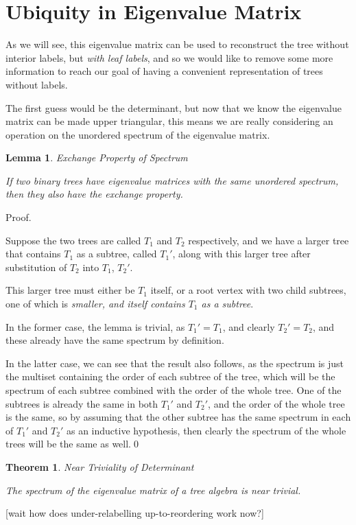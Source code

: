 \documentclass[10pt,a4paper]{report}
\newtheorem{theorem}{Theorem}
\newtheorem{lemma}{Lemma}
\begin{document}
\section{Ubiquity in Eigenvalue Matrix}

As we will see, this eigenvalue matrix can be used to reconstruct the tree without interior labels, but \emph{with leaf labels}, and so we would like to remove some more information to reach our goal of having a convenient representation of trees without labels.

The first guess would be the determinant, but now that we know the eigenvalue matrix can be made upper triangular, this means we are really considering an operation on the unordered spectrum of the eigenvalue matrix.

\begin{lemma} Exchange Property of Spectrum

	If two binary trees have eigenvalue matrices with the same unordered
	spectrum, then they also have the exchange property.
\end{lemma}

Proof.

Suppose the two trees are called $T_1$ and $T_2$ respectively, and we have a
larger tree that contains $T_1$ as a subtree, called $T_1\prime$, along with
this larger tree after substitution of $T_2$ into $T_1$, $T_2\prime$.

This larger tree must either be $T_1$ itself, or a root vertex with two child
subtrees, one of which is \emph{smaller, and itself contains $T_1$ as a
subtree}.

In the former case, the lemma is trivial, as $T_1\prime=T_1$, and clearly
$T_2\prime=T_2$, and these already have the same spectrum by definition.

In the latter case, we can see that the result also follows, as the spectrum is
just the multiset containing the order of each subtree of the tree, which will
be the spectrum of each subtree combined with the order of the whole tree.
One of the subtrees is already the same in both $T_1\prime$ and $T_2\prime$,
and the order of the whole tree is the same, so by assuming that the other
subtree has the same spectrum in each of $T_1\prime$ and $T_2\prime$ as an
inductive hypothesis, then clearly the spectrum of the whole trees will be the
same as well.\qed

\begin{theorem} Near Triviality of Determinant

	The spectrum of the eigenvalue matrix of a tree algebra is near trivial.
\end{theorem}
[wait how does under-relabelling up-to-reordering work now?]
\end{document}
